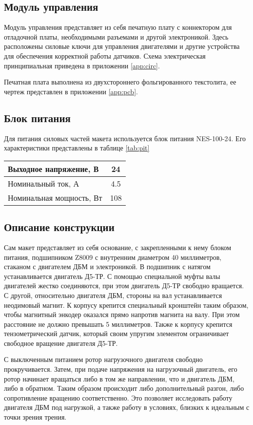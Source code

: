 \subsection{Модуль управления}

Модуль управления представляет из себя печатную плату с коннектором для отладочной платы, необходимыми 
разъемами и другой электроникой. Здесь расположены силовые ключи для управления 
двигателями и другие устройства для обеспечения корректной работы датчиков.
Схема электрическая принципиальная приведена в приложении \ref{app:circ}.

Печатная плата выполнена из двухстороннего фольгированного текстолита, ее чертеж представлен
в приложении \ref{app:pcb}.

\subsection{Блок питания}

Для питания силовых частей макета используется блок питания NES-100-24. Его характеристики представлены в таблице \ref{tab:pit}

\begin{tabularx}{\textwidth}{|X|c|}
  \caption{Характеристики блока питания}\label{tab:pit}\\
  \hline
    Выходное напряжение, В & 24 \\
  \hline
    Номинальный ток, А & 4.5 \\
  \hline
    Номинальная мощность, Вт & 108 \\
  \hline
\end{tabularx}

\subsection{Описание конструкции}

Сам макет представляет из себя основание, с закрепленными к нему блоком питания, подшипником Z8009 
с внутренним диаметром 40 миллиметров, стаканом с двигателем ДБМ и электроникой. 
В подшипник с натягом устанавливается двигатель Д5-ТР. С помощью специальной муфты валы двигателей
жестко соединяются, при этом двигатель Д5-ТР свободно вращается. С другой, относительно двигателя ДБМ,
стороны на вал устанавливается неодимовый магнит. К корпусу крепится специальный кронштейн таким 
образом, чтобы магнитный энкодер оказался прямо напротив магнита на валу. При этом расстояние не должно
превышать 5 миллиметров. Также к корпусу крепится тензометрический
датчик, который своим упругим элементом ограничивает свободное вращение двигателя Д5-ТР.

С выключенным питанием ротор нагрузочного двигателя свободно прокручивается. Затем, при подаче
напряжения на нагрузочный двигатель, его ротор начинает вращаться либо в том же направлении, что и 
двигатель ДБМ, либо в обратном. Таким образом происходит либо дополнительный разгон, либо 
сопротивление вращению соответственно. Это позволяет исследовать работу двигателя ДБМ под нагрузкой,
а также работу в условиях, близких к идеальным с точки зрения трения.


